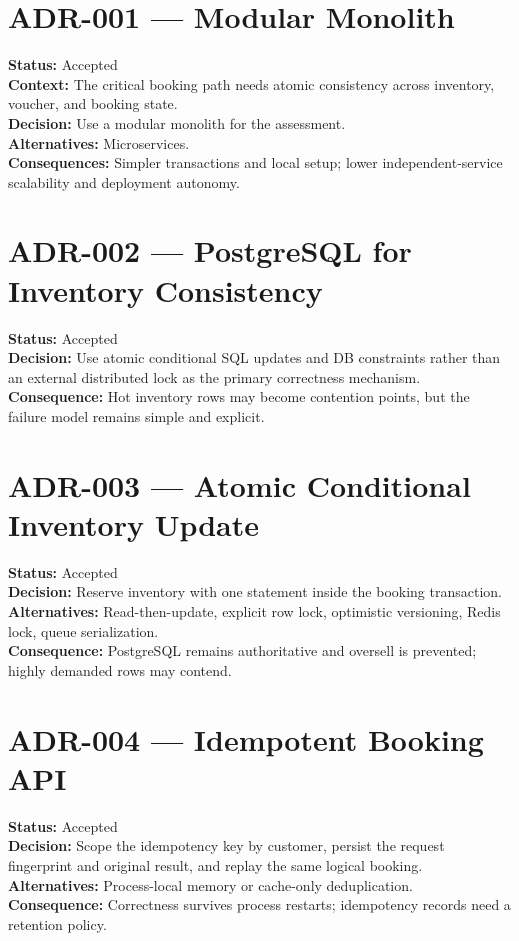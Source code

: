 \section{ADR-001 --- Modular Monolith}
\textbf{Status:} Accepted\\
\textbf{Context:} The critical booking path needs atomic consistency across inventory, voucher, and booking state.\\
\textbf{Decision:} Use a modular monolith for the assessment.\\
\textbf{Alternatives:} Microservices.\\
\textbf{Consequences:} Simpler transactions and local setup; lower independent-service scalability and deployment autonomy.

\section{ADR-002 --- PostgreSQL for Inventory Consistency}
\textbf{Status:} Accepted\\
\textbf{Decision:} Use atomic conditional SQL updates and DB constraints rather than an external distributed lock as the primary correctness mechanism.\\
\textbf{Consequence:} Hot inventory rows may become contention points, but the failure model remains simple and explicit.

\section{ADR-003 --- Atomic Conditional Inventory Update}
\textbf{Status:} Accepted\\
\textbf{Decision:} Reserve inventory with one  statement inside the booking transaction.\\
\textbf{Alternatives:} Read-then-update, explicit row lock, optimistic versioning, Redis lock, queue serialization.\\
\textbf{Consequence:} PostgreSQL remains authoritative and oversell is prevented; highly demanded rows may contend.

\section{ADR-004 --- Idempotent Booking API}
\textbf{Status:} Accepted\\
\textbf{Decision:} Scope the idempotency key by customer, persist the request fingerprint and original result, and replay the same logical booking.\\
\textbf{Alternatives:} Process-local memory or cache-only deduplication.\\
\textbf{Consequence:} Correctness survives process restarts; idempotency records need a retention policy.

